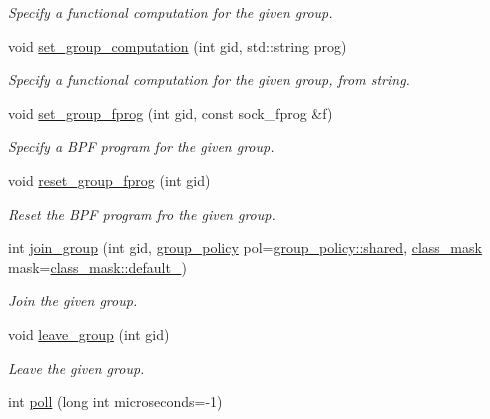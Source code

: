 \begin{DoxyCompactItemize}
\begin{DoxyCompactList}\small\item\em Specify a functional computation for the given group. \end{DoxyCompactList}\item 
void \hyperlink{classpfq_1_1socket_a968ae9e3375650990488dcb1784a4bd1}{set\+\_\+group\+\_\+computation} (int gid, std\+::string prog)
\begin{DoxyCompactList}\small\item\em Specify a functional computation for the given group, from string. \end{DoxyCompactList}\item 
void \hyperlink{classpfq_1_1socket_ad618894910a12a08eaed3d8668db25af}{set\+\_\+group\+\_\+fprog} (int gid, const sock\+\_\+fprog \&f)
\begin{DoxyCompactList}\small\item\em Specify a B\+P\+F program for the given group. \end{DoxyCompactList}\item 
void \hyperlink{classpfq_1_1socket_a2327e71a6f94e54efb0da5ec36b1c620}{reset\+\_\+group\+\_\+fprog} (int gid)
\begin{DoxyCompactList}\small\item\em Reset the B\+P\+F program fro the given group. \end{DoxyCompactList}\item 
int \hyperlink{classpfq_1_1socket_afbd75341794fae964ed23ce5858fd153}{join\+\_\+group} (int gid, \hyperlink{namespacepfq_ac41249c8510558905b01fa4d866a38d7}{group\+\_\+policy} pol=\hyperlink{namespacepfq_ac41249c8510558905b01fa4d866a38d7a9e81e7b963c71363e2fb3eefcfecfc0e}{group\+\_\+policy\+::shared}, \hyperlink{namespacepfq_a96af1f5ed530eff563eb917516758fbb}{class\+\_\+mask} mask=\hyperlink{namespacepfq_a96af1f5ed530eff563eb917516758fbba172b03053216c6158fe380805998ad6c}{class\+\_\+mask\+::default\+\_\+})
\begin{DoxyCompactList}\small\item\em Join the given group. \end{DoxyCompactList}\item 
void \hyperlink{classpfq_1_1socket_ac512d6b89db52da73a51ba9112658180}{leave\+\_\+group} (int gid)
\begin{DoxyCompactList}\small\item\em Leave the given group. \end{DoxyCompactList}\item 
int \hyperlink{classpfq_1_1socket_ad8ce551ea07f39317bb383ab88d66344}{poll} (long int microseconds=-\/1)

\end{DoxyCompactItemize}
